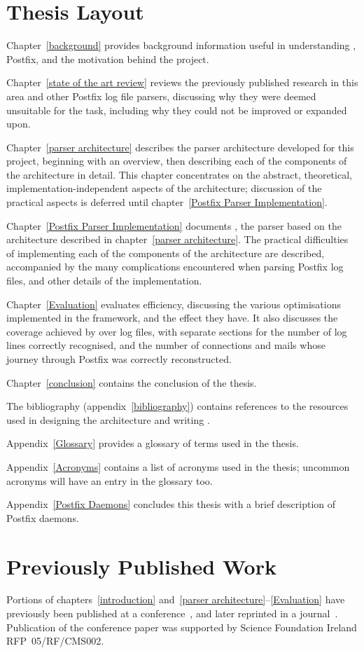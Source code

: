 \section{Thesis Layout}

Chapter~\ref{background} provides background information useful in
understanding , Postfix, and the motivation behind the
project.

Chapter~\ref{state of the art review} reviews the previously published
research in this area and other Postfix log file parsers, discussing why
they were deemed unsuitable for the task, including why they could not be
improved or expanded upon.

Chapter~\ref{parser architecture} describes the parser architecture
developed for this project, beginning with an overview, then describing
each of the components of the architecture in detail.  This chapter
concentrates on the abstract, theoretical, implementation-independent
aspects of the architecture; discussion of the practical aspects is
deferred until chapter~\ref{Postfix Parser Implementation}.

Chapter~\ref{Postfix Parser Implementation} documents \parsername{}, the
parser based on the architecture described in chapter~\ref{parser
architecture}.  The practical difficulties of implementing each of the
components of the architecture are described, accompanied by the many
complications encountered when parsing Postfix log files, and other details
of the implementation.

Chapter~\ref{Evaluation} evaluates \parsernames{} efficiency, discussing
the various optimisations implemented in the framework, and the effect they
have.  It also discusses the coverage achieved by \parsername{} over
\numberOFlogFILES{} log files, with separate sections for the number of log
lines correctly recognised, and the number of connections and mails whose
journey through Postfix was correctly reconstructed.

Chapter~\ref{conclusion} contains the conclusion of the thesis.

The bibliography (appendix~\ref{bibliography}) contains references to the
resources used in designing the architecture and writing \parsername{}.

Appendix~\ref{Glossary} provides a glossary of terms used in the thesis.

Appendix~\ref{Acronyms} contains a list of acronyms used in the thesis;
uncommon acronyms will have an entry in the glossary too.

Appendix~\ref{Postfix Daemons} concludes this thesis with a brief
description of Postfix daemons.

\section{Previously Published Work}

Portions of chapters~\ref{introduction} and~\ref{parser
architecture}--\ref{Evaluation} have previously been published at a
conference~\cite{sgai-2008}, and later reprinted in a
journal~\cite{elsevier-2009}.  Publication of the conference paper was
supported by Science Foundation Ireland RFP~05/RF/CMS002.
